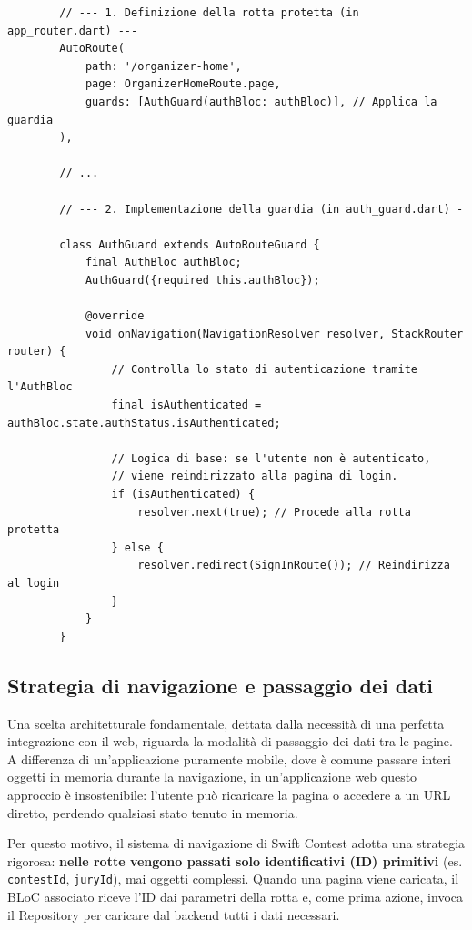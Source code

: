 \begin{longlisting}
    \begin{verbatim}
        // --- 1. Definizione della rotta protetta (in app_router.dart) ---
        AutoRoute(
            path: '/organizer-home',
            page: OrganizerHomeRoute.page,
            guards: [AuthGuard(authBloc: authBloc)], // Applica la guardia
        ),

        // ...

        // --- 2. Implementazione della guardia (in auth_guard.dart) ---
        class AuthGuard extends AutoRouteGuard {
            final AuthBloc authBloc;
            AuthGuard({required this.authBloc});

            @override
            void onNavigation(NavigationResolver resolver, StackRouter router) {
                // Controlla lo stato di autenticazione tramite l'AuthBloc
                final isAuthenticated = authBloc.state.authStatus.isAuthenticated;

                // Logica di base: se l'utente non è autenticato,
                // viene reindirizzato alla pagina di login.
                if (isAuthenticated) {
                    resolver.next(true); // Procede alla rotta protetta
                } else {
                    resolver.redirect(SignInRoute()); // Reindirizza al login
                }
            }
        }
    \end{verbatim}
    \caption{Estratto del sistema di routing protetto con ``AuthGuard''.}
    \label{lst:auth_guard}
\end{longlisting}

\subsection{Strategia di navigazione e passaggio dei dati}\label{subsec:strategia-di-navigazione-e-passaggio-dei-dati}
Una scelta architetturale fondamentale, dettata dalla necessità di una perfetta integrazione con il web, riguarda la modalità di passaggio dei dati tra le pagine.
A differenza di un'applicazione puramente mobile, dove è comune passare interi oggetti in memoria durante la navigazione, in un'applicazione web questo approccio è insostenibile: l'utente può ricaricare la pagina o accedere a un URL diretto, perdendo qualsiasi stato tenuto in memoria.

Per questo motivo, il sistema di navigazione di Swift Contest adotta una strategia rigorosa: \textbf{nelle rotte vengono passati solo identificativi (ID) primitivi} (es. \texttt{contestId}, \texttt{juryId}), mai oggetti complessi.
Quando una pagina viene caricata, il BLoC associato riceve l'ID dai parametri della rotta e, come prima azione, invoca il Repository per caricare dal backend tutti i dati necessari.

